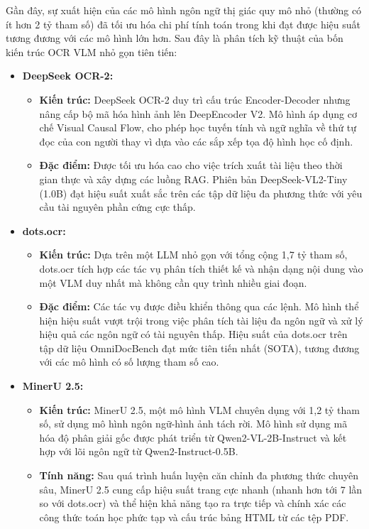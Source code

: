 Gần đây, sự xuất hiện của các mô hình ngôn ngữ thị giác quy mô nhỏ (thường có ít hơn 2 tỷ tham số) đã tối ưu hóa chi phí tính toán trong khi đạt được hiệu suất tương đương với các mô hình lớn hơn. Sau đây là phân tích kỹ thuật của bốn kiến trúc OCR VLM nhỏ gọn tiên tiến:


\begin{itemize}
    \item \textbf{DeepSeek OCR-2:}
    \begin{itemize}
        \item \textbf{Kiến trúc:} DeepSeek OCR-2 duy trì cấu trúc Encoder-Decoder nhưng nâng cấp bộ mã hóa hình ảnh lên DeepEncoder V2. Mô hình áp dụng cơ chế Visual Causal Flow, cho phép học tuyến tính và ngữ nghĩa về thứ tự đọc của con người thay vì dựa vào các sắp xếp tọa độ hình học cố định.
        \item \textbf{Đặc điểm:} Được tối ưu hóa cao cho việc trích xuất tài liệu theo thời gian thực và xây dựng các luồng RAG. Phiên bản DeepSeek-VL2-Tiny (1.0B) đạt hiệu suất xuất sắc trên các tập dữ liệu đa phương thức với yêu cầu tài nguyên phần cứng cực thấp.
    \end{itemize}

    \item \textbf{dots.ocr:}
    \begin{itemize}
        \item \textbf{Kiến trúc:} Dựa trên một LLM nhỏ gọn với tổng cộng 1,7 tỷ tham số, dots.ocr tích hợp các tác vụ phân tích thiết kế và nhận dạng nội dung vào một VLM duy nhất mà không cần quy trình nhiều giai đoạn.
        \item \textbf{Đặc điểm:} Các tác vụ được điều khiển thông qua các lệnh. Mô hình thể hiện hiệu suất vượt trội trong việc phân tích tài liệu đa ngôn ngữ và xử lý hiệu quả các ngôn ngữ có tài nguyên thấp. Hiệu suất của dots.ocr trên tập dữ liệu OmniDocBench đạt mức tiên tiến nhất (SOTA), tương đương với các mô hình có số lượng tham số cao.
    \end{itemize}

    \item \textbf{MinerU 2.5:}
    \begin{itemize}
        \item \textbf{Kiến trúc:} MinerU 2.5, một mô hình VLM chuyên dụng với 1,2 tỷ tham số, sử dụng mô hình ngôn ngữ-hình ảnh tách rời. Mô hình sử dụng mã hóa độ phân giải gốc được phát triển từ Qwen2-VL-2B-Instruct và kết hợp với lõi ngôn ngữ từ Qwen2-Instruct-0.5B.
        \item \textbf{Tính năng:} Sau quá trình huấn luyện căn chỉnh đa phương thức chuyên sâu, MinerU 2.5 cung cấp hiệu suất trang cực nhanh (nhanh hơn tới 7 lần so với dots.ocr) và thể hiện khả năng tạo ra trực tiếp và chính xác các công thức toán học phức tạp và cấu trúc bảng HTML từ các tệp PDF.
    \end{itemize}


\end{itemize}

